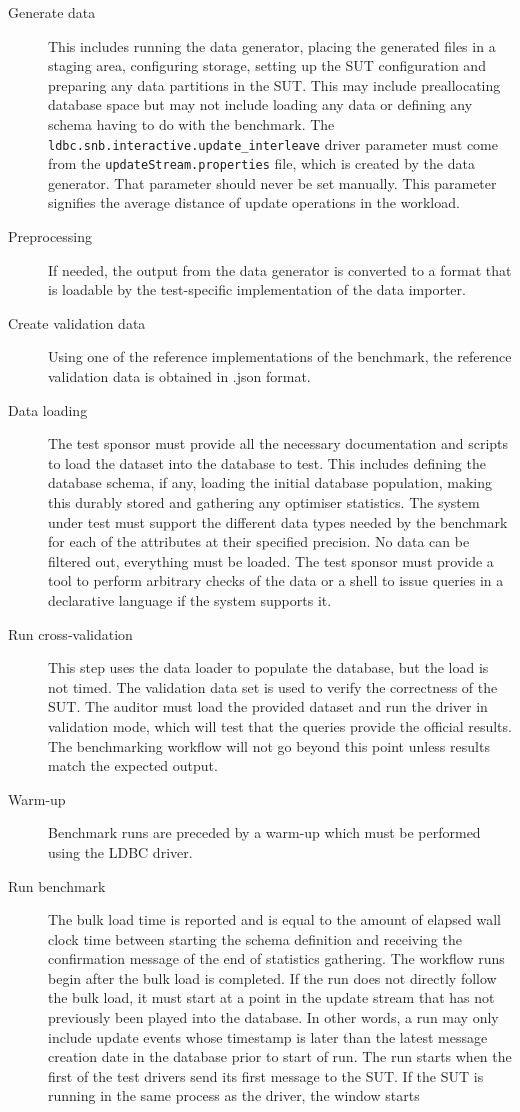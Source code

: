 \begin{description}
    \item[Generate data] This includes running the data generator, placing the generated files in a staging area, configuring storage, setting up the SUT configuration and preparing any data partitions in the SUT. This may include preallocating database space but may not include loading any data or defining any schema having to do with the benchmark. The \verb|ldbc.snb.interactive.update_interleave| driver parameter must come from the \verb|updateStream.properties| file, which is created by the data generator. That parameter should never be set manually. This parameter signifies the average distance of update operations in the workload.
    \item[Preprocessing] If needed, the output from the data generator is converted to a format that is loadable by the test-specific implementation of the data importer.
    \item[Create validation data] Using one of the reference implementations of the benchmark, the reference validation data is obtained in .json format.
    \item[Data loading] The test sponsor must provide all the necessary documentation and scripts to load the dataset into the database to test.
    This includes defining the database schema, if any, loading the initial database population, making this durably stored and gathering any optimiser statistics.
    The system under test must support the different data types needed by the benchmark for each of the attributes at their specified precision. No data can be filtered out, everything must be loaded. The test sponsor must provide a tool to perform arbitrary checks of the data or a shell to issue queries in a declarative language if the system supports it.
    \item[Run cross-validation] This step uses the data loader to populate the database, but the load is not timed. The validation data set is used to verify the correctness of the SUT. The auditor must load the provided dataset and run the driver in validation mode, which will test that the queries provide the official results.  The benchmarking workflow will not go beyond this point unless results match the expected output.
    \item[Warm-up] Benchmark runs are preceded by a warm-up which must be performed using the LDBC driver.
    \item[Run benchmark]  The bulk load time is reported and is equal to the amount of elapsed wall clock time between starting the schema definition and receiving the confirmation message of the end of statistics gathering. The workflow runs begin after the bulk load is completed. If the run does not directly follow the bulk load, it must start at a point in the update stream that has not previously been played into the database. In other words, a run may only include update events whose timestamp is later than the latest message creation date in the database prior to start of run. The run starts when the first of the test drivers send its first message to the SUT. If the SUT is running in the same process as the driver, the window starts

\end{description}
